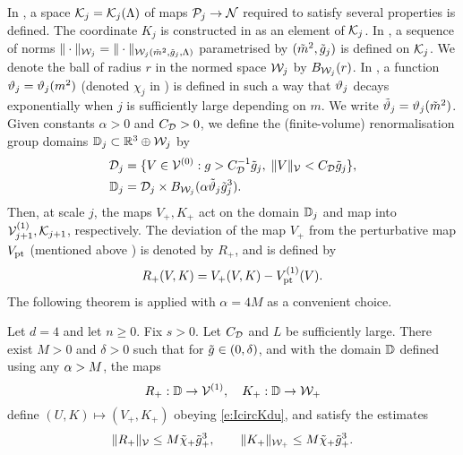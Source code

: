In \cite[Definition~\ref{step-def:Kspace}]{BS-rg-step},
a space $\mathcal{K}_j = \mathcal{K}_j(\Lambda)$ of maps $\mathcal{P}_j \rightarrow \mathcal{N}$ required to satisfy
several properties is defined.
The coordinate $K_j$ is constructed in \cite{BS-rg-step} as an element of $\mathcal{K}_j$.
In \cite[Section~\ref{step-sec:Knorms}]{BS-rg-step},
a sequence of norms $\|\cdot\|_{\mathcal{W}_j} = \|\cdot\|_{\mathcal{W}_j(\tilde{m}^2, \tilde{g}_j, \Lambda)}$
parametrised by $(\tilde{m}^2, \tilde{g}_j)$ is defined on $\mathcal{K}_j$.
We denote the ball of radius $r$ in
the normed space $\mathcal{W}_j$ by $B_{\mathcal{W}_j}(r)$.
In \cite[\eqref{log-e:mass-scale}--\eqref{log-e:chidef}]{BBS-saw4-log},
a function $\vartheta_j = \vartheta_j(m^2)$ (denoted $\chi_j$ in \cite{BBS-saw4-log})
is defined in such a way that $\vartheta_j$ decays exponentially
when $j$ is sufficiently large depending on $m$.
We write $\tilde{\vartheta}_j = \vartheta_j(\tilde{m}^2)$.
Given constants $\alpha > 0$ and $C_{\mathcal{D}} > 0$,
we define the (finite-volume)
renormalisation group domains $\mathbb{D}_j \subset {\mathbb R}^3 \oplus \mathcal{W}_j$ by
\begin{align}
\label{e:DVdef}
	\mathcal{D}_j &= \{V\in \mathcal{V}^{(0)} :
	g> C_{\mathcal{D}}^{-1} \tilde{g}_j  , \;  \|V\|_{\mathcal{V}} < C_{\mathcal{D}} \tilde{g}_j \},
\\
\mathbb{D}_j &= \mathcal{D}_j \times B_{\mathcal{W}_j}(\alpha \tilde{\vartheta}_j \tilde{g}_j^3).
\end{align}
Then, at scale $j$, the maps $V_+,K_+$ act on the domain $\mathbb{D}_j$
and map into $\mathcal{V}_{j+1}^{(1)},\mathcal{K}_{j+1}$, respectively.
The deviation of the map $V_+$ from the perturbative map $V_{\rm pt}$ (mentioned above )
is denoted by $R_+$, and is defined by
\begin{equation}
\label{e:Rplusdef}
    R_+(V,K) = V_+(V,K) -V_{\rm pt}^{(1)}(V).
\end{equation}
The following theorem is applied with $\alpha =4M$ as a convenient choice.

\begin{theorem}
\label{thm:step-mr-fv}
Let $d = 4$ and let $n \ge 0$. Fix $s > 0$.
Let $C_{\mathcal{D}}$ and $L$ be sufficiently large.
There exist $M>0$ and $\delta >0$ such that
for $\tilde{g} \in (0,\delta)$, %
and with the domain
$\mathbb{D}$ defined using any $\alpha> M$, the maps
\begin{equation}
\label{e:RKplusmaps}
R_+:\domRG %
\to \Vcal^{(1)},
\quad
K_+:\domRG %
\to \Wcal_{+}%
\end{equation}
define $(U,K)\mapsto (V_+,K_+)$ obeying \eqref{e:IcircKdu},
and satisfy the estimates
\begin{equation}
\label{e:RKplus}
\|R_+\|_{\mathcal{V}}
\le
M\tilde{\chi}_+\tilde{g}_+^{3}
, \qquad
\|K_+\|_{\mathcal{W}_+}
\le
M\tilde{\chi}_+ \tilde{g}_+^{3}
.
\end{equation}
\end{theorem}

